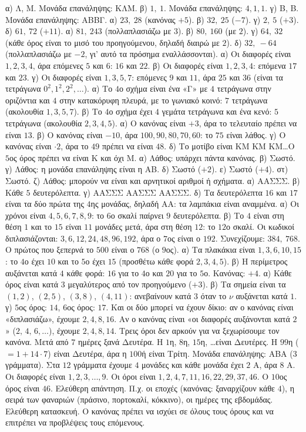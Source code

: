  α) Λ, Μ. Μονάδα επανάληψης: ΚΛΜ. β) $1,\ 1$. Μονάδα επανάληψης: $4,1,1$. γ) Β, Β. Μονάδα επανάληψης: ΑΒΒΓ.
 α) $23,\ 28$ (κανόνας $+5$). β) $32,\ 25$ ($-7$). γ) $2,\ 5$ ($+3$). δ) $61,\ 72$ ($+11$).
 α) $81,\ 243$ (πολλαπλασιάζω με $3$). β) $80,\ 160$ (με $2$). γ) $64,\ 32$ (κάθε όρος είναι το μισό του προηγούμενου, δηλαδή διαιρώ με $2$). δ) $32,\ -64$ (πολλαπλασιάζω με $-2$, γι' αυτό τα πρόσημα εναλλάσσονται).
 α) Οι διαφορές είναι $1,2,3,4$, άρα επόμενες $5$ και $6$: $16$ και $22$. β) Οι διαφορές είναι $1,2,3,4$: επόμενα $17$ και $23$. γ) Οι διαφορές είναι $1,3,5,7$: επόμενες $9$ και $11$, άρα $25$ και $36$ (είναι τα τετράγωνα $0^2,1^2,2^2,\dots$).
 α) Το $4$ο σχήμα είναι ένα «Γ» με $4$ τετράγωνα στην οριζόντια και $4$ στην κατακόρυφη πλευρά, με το γωνιακό κοινό: $7$ τετράγωνα (ακολουθία $1,3,5,7$). β) Το $4$ο σχήμα έχει $4$ γεμάτα τετράγωνα και ένα κενό: $5$ τετράγωνα (ακολουθία $2,3,4,5$).
 α) Ο κανόνας είναι $+3$, άρα το τελευταίο πρέπει να είναι $13$. β) Ο κανόνας είναι $-10$, άρα $100,90,80,70,60$: το $75$ είναι λάθος. γ) Ο κανόνας είναι $\cdot2$, άρα το $49$ πρέπει να είναι $48$. δ) Το μοτίβο είναι ΚΜ ΚΜ ΚΜ\ldots Ο $5$ος όρος πρέπει να είναι Κ και όχι Μ.
 α) Λάθος: υπάρχει πάντα κανόνας. β) Σωστό. γ) Λάθος: η μονάδα επανάληψης είναι η ΑΒ. δ) Σωστό ($+2$). ε) Σωστό ($+4$). στ) Σωστό. ζ) Λάθος: μπορούν να είναι και αρνητικοί αριθμοί ή σχήματα.
 α) ΑΑΣΣΣ. β) Κάθε $5$ δευτερόλεπτα. γ) ΑΑΣΣΣ ΑΑΣΣΣ ΑΑΣΣΣ. δ) Τα δευτερόλεπτα $16$ και $17$ είναι τα δύο πρώτα της $4$ης μονάδας, δηλαδή ΑΑ: τα λαμπάκια είναι αναμμένα.
 α) Οι χρόνοι είναι $4,5,6,7,8,9$: το $6$ο σκαλί παίρνει $9$ δευτερόλεπτα. β) Το $4$ είναι στη θέση $1$ και το $15$ είναι $11$ μονάδες μετά, άρα στη θέση $12$: το $12$ο σκαλί.
 Οι κωδικοί διπλασιάζονται: $3,6,12,24,48,96,192$, άρα ο $7$ος είναι ο $192$. Συνεχίζουμε: $384,\ 768$. Ο πρώτος που ξεπερνά το $500$ είναι ο $768$ (ο $9$ος).
 α) Τα πλακάκια είναι $1,3,6,10,15$: το $4$ο έχει $10$ και το $5$ο έχει $15$ (προσθέτω κάθε φορά $2,3,4,5$). β) Η περίμετρος αυξάνεται κατά $4$ κάθε φορά: $16$ για το $4$ο και $20$ για το $5$ο. Κανόνας: $+4$.
 α) Κάθε όρος είναι κατά $3$ μεγαλύτερος από τον προηγούμενο ($+3$). β) Τα σημεία είναι τα $(1,2)$, $(2,5)$, $(3,8)$, $(4,11)$: ανεβαίνουν κατά $3$ όταν το $\nu$ αυξάνεται κατά $1$. γ) $5$ος όρος: $14$, $6$ος όρος: $17$.
 Και οι δύο μπορεί να έχουν δίκιο: αν ο κανόνας είναι «διπλασιάζω», έχουμε $2,4,8,16$. Αν ο κανόνας είναι «οι διαφορές αυξάνονται κατά $2$» ($2,\,4,\,6,\dots$), έχουμε $2,4,8,14$. Τρεις όροι δεν αρκούν για να ξεχωρίσουμε τον κανόνα.
 Μετά από $7$ ημέρες ξανά Δευτέρα. Η $1$η, $8$η, $15$η, \ldots είναι Δευτέρες. Η $99$η ($=1+14\cdot7$) είναι Δευτέρα, άρα η $100$ή είναι Τρίτη.
 Μονάδα επανάληψης: ΑΒΑ ($3$ γράμματα). Στα $12$ γράμματα έχουμε $4$ μονάδες και κάθε μονάδα έχει $2$ Α, άρα $8$ Α.
 Οι διαφορές είναι $1,2,3,\dots,9$. Οι όροι είναι $1,2,4,7,11,16,22,29,37,46$. Ο $10$ος όρος είναι $46$.
 Ελεύθερη απάντηση. Π.χ. οι εποχές (κανόνας: ξαναρχίζουν κάθε $4$), η σειρά των φαναριών (πράσινο, πορτοκαλί, κόκκινο), οι ημέρες της εβδομάδας.
 Ελεύθερη κατασκευή. Ο κανόνας πρέπει να ισχύει σε όλους τους όρους και να επιτρέπει να προβλέψεις τους επόμενους.
